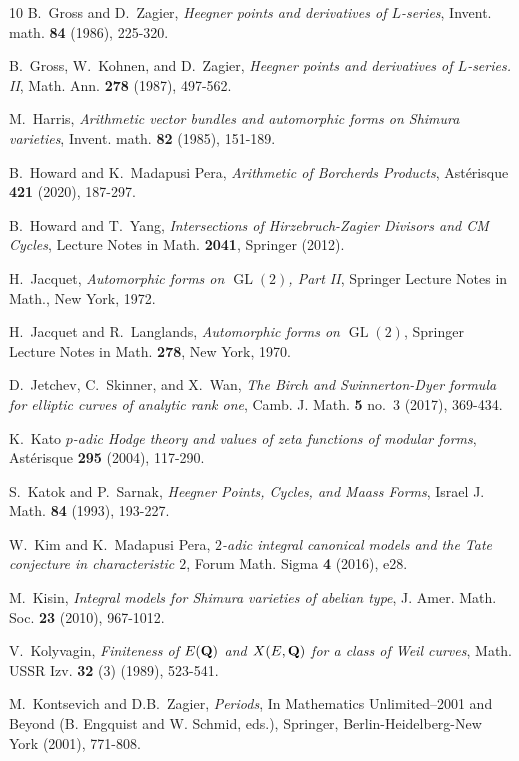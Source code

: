 \documentclass{amsart}
\theoremstyle{definition}
\theoremstyle{definition}
\theoremstyle{definition}
\begin{document}
\begin{thebibliography}{10}
 B.~Gross and D.~Zagier, {\it{Heegner points and derivatives of $L$-series}}, Invent. math. {\bf{84}} (1986), 225-320.

 B.~Gross, W.~Kohnen, and D.~Zagier, {\it{Heegner points and derivatives of $L$-series. II}}, Math. Ann. {\bf{278}} (1987), 497-562.

 M.~Harris, {\it{Arithmetic vector bundles and automorphic forms on Shimura varieties}}, Invent. math. {\bf{82}} (1985), 151-189.

 B.~Howard and K.~Madapusi Pera, {\it{Arithmetic of Borcherds Products}}, Ast\'erisque {\bf{421}} (2020), 187-297.
 
 B.~Howard and T.~Yang, {\it{Intersections of Hirzebruch-Zagier Divisors and CM Cycles}}, Lecture Notes in Math. {\bf{2041}}, Springer (2012).
 
 H.~Jacquet, {\it{Automorphic forms on $\operatorname{GL}(2)$, Part II}}, Springer Lecture Notes in Math., New York, 1972.

 H.~Jacquet and R.~Langlands, {\it{Automorphic forms on $\operatorname{GL}(2)$}}, Springer Lecture Notes in Math. {\bf{278}}, New York, 1970.
 
 D.~Jetchev, C.~Skinner, and X.~Wan, {\it{The Birch and Swinnerton-Dyer formula for elliptic curves of analytic rank one}}, 
Camb. J. Math. {\bf{5}} no.~3 (2017), 369-434.
 
 K.~Kato {\it{$p$-adic Hodge theory and values of zeta functions of modular forms}}, Ast\'{e}risque {\bf{295}} (2004), 117-290.

 S.~Katok and P.~Sarnak, {\it{Heegner Points, Cycles, and Maass Forms}}, Israel J. Math. {\bf{84}} (1993), 193-227.
        
 W.~Kim and K.~Madapusi Pera, {\it{$2$-adic integral canonical models and the Tate conjecture in characteristic $2$}}, 
Forum Math. Sigma {\bf{4}} (2016), e28.
 
 M.~Kisin, {\it{Integral models for Shimura varieties of abelian type}}, J. Amer. Math. Soc. {\bf{23}} (2010), 967-1012.

 V.~Kolyvagin, {\it{Finiteness of $E({\bf{Q}})$ and $X(E, {\bf{Q}})$ for a class of Weil curves}}, Math. USSR Izv. {\bf{32}} (3) (1989), 523-541.

 M.~Kontsevich and D.B.~Zagier, {\it{Periods}}, In Mathematics Unlimited--2001 and Beyond (B. Engquist and W. Schmid, eds.), 
Springer, Berlin-Heidelberg-New York (2001), 771-808.


\end{thebibliography}
\end{document}
